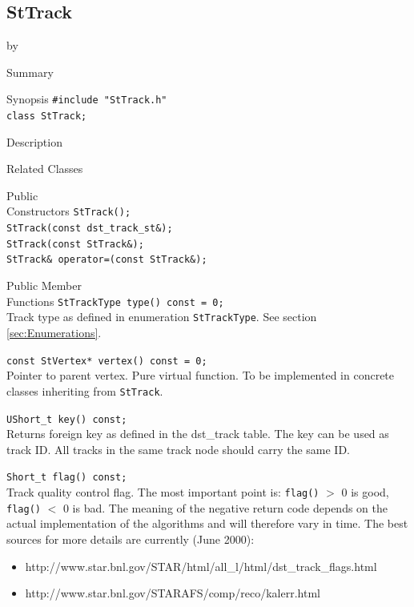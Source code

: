 \documentclass[twoside]{article}
\newcommand{\entrylabel}[1]{\mbox{\textbf{{#1}}}\hfil}%
\newenvironment{entry}
{\begin{list}{}%
    {\renewcommand{\makelabel}{\entrylabel}%
     \setlength{\labelwidth}{90pt}%
     \setlength{\leftmargin}{\labelwidth}
     \advance\leftmargin by \labelsep%
      }%
    }%
  {\end{list}}
\newcommand{\Entrylabel}[1]%
{\raisebox{0pt}[1ex][0pt]{\makebox[\labelwidth][l]%
    {\parbox[t]{\labelwidth}{\hspace{0pt}\textbf{{#1}}}}}}
\newenvironment{Entry}%
{\renewcommand{\entrylabel}{\Entrylabel}\begin{entry}}%
  {\end{entry}}
\begin{document}
\subsection{StTrack}
\label{sec:StTrack}
\begin{Entry}
\item[Summary]
\item[Synopsis]
    \verb+#include "StTrack.h"+\\
    \verb+class StTrack;+\\
\item[Description]
\item[Related Classes]
\item[Public\\ Constructors]
    \verb+StTrack();+\\
    \verb+StTrack(const dst_track_st&);+\\
    \verb+StTrack(const StTrack&);+\\
    \verb+StTrack& operator=(const StTrack&);+\\
\item[Public Member\\ Functions]
    \verb+StTrackType type() const = 0;+\\
    Track type as defined in enumeration \texttt{StTrackType}.
    See section \ref{sec:Enumerations}.
    
    \verb+const StVertex* vertex() const = 0;+\\
    Pointer to parent vertex.
    Pure virtual function. To be implemented in
    concrete classes inheriting from \texttt{StTrack}.
    
    \verb+UShort_t key() const;+\\
    Returns foreign key as defined in the dst\_track table.
    The key can be used as track ID. All tracks in the same
    track node should carry the same ID. 
    
    \verb+Short_t flag() const;+\\
    Track quality control flag.   The most important
    point is: \texttt{flag()} $>$ 0 is good, \texttt{flag()} $<$ 0 is bad.  The meaning
    of the negative return code depends on the actual implementation
    of the algorithms and will therefore vary in time.  The best
    sources for more details are currently (June 2000):    
    \begin{itemize}
    \item http://www.star.bnl.gov/STAR/html/all\_l/html/dst\_track\_flags.html
    \item http://www.star.bnl.gov/STARAFS/comp/reco/kalerr.html
    \end{itemize} 
     

\end{Entry}
\end{document}
